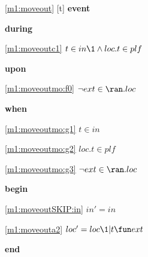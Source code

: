 \noindent \ref{m1:moveout} [t] \textbf{event}
\begin{block}
\item \textbf{during}
\begin{block}
\item[ \eqref{m1:moveoutc1} ]$t \in in  %
		\1\land loc.t \in plf $ %
\end{block}
\item \textbf{upon}
\begin{block}
\item[ \eqref{m1:moveoutmo:f0} ]$\neg ext \in \ran. loc $ %
\end{block}
\item \textbf{when}
\begin{block}
\item[ \eqref{m1:moveoutmo:g1} ]$t \in in $ %
\item[ \eqref{m1:moveoutmo:g2} ]$loc.t \in plf $ %
\item[ \eqref{m1:moveoutmo:g3} ]$\neg ext \in \ran. loc $ %
\end{block}
\item \textbf{begin}
\begin{block}
\item[ \eqref{m1:moveoutSKIP:in} ]$in' = in$ %
\item[ \eqref{m1:moveouta2} ]$loc' = loc \1 | t \fun ext $ %
\end{block}
\item \textbf{end} \\
\end{block}
